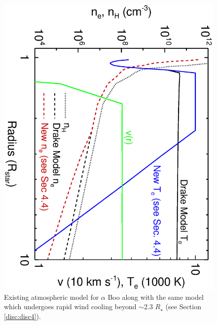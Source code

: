 \documentclass[iop]{emulateapj}
\begin{document}
\begin{figure}
\includegraphics[trim = 0mm 0mm 0mm 0mm, clip,scale=0.36,angle=90]{fig0.ps}
\caption{Existing atmospheric model for $\alpha$ Boo \cite[`model A']{1985pssl.proc..351D} along with the same model which undergoes rapid wind cooling beyond $\sim$2.3 $R_{\star}$ (see Section \ref{disc:disc4}). }
\label{fig:fig0}
\end{figure}
\end{document}
